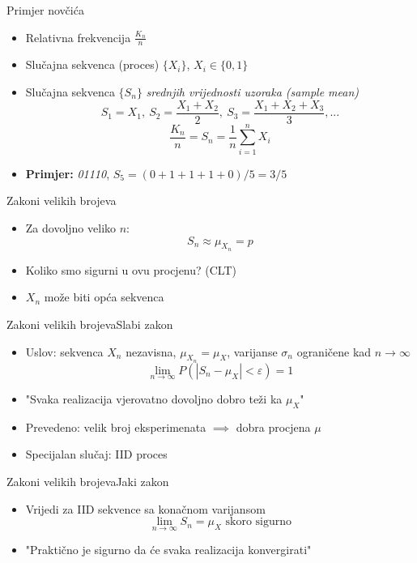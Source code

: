 \documentclass[aspectratio=169]{beamer}
\begin{document}
  \begin{frame}{Primjer novčića}
    \begin{itemize}
      \item Relativna frekvencija $\frac{K_n}{n}$
      \item Slučajna sekvenca (proces) $\{X_i\}$, $X_i \in \{0,1\}$
      \item Slučajna sekvenca $\{S_n\}$ \textit{srednjih vrijednosti uzoraka
        (sample mean)}
        $$S_1=X_1,\ S_2=\frac{X_1+X_2}{2},\ S_3=\frac{X_1+X_2+X_3}{3},...$$
        $$\boxed{\frac{K_n}{n} = S_n = \frac{1}{n} \sum_{i=1}^n X_i}$$
      \item \textbf{Primjer:} \textit{01110}, $S_5=(0+1+1+1+0)/5=3/5$
    \end{itemize}
  \end{frame}
  
  \begin{frame}{Zakoni velikih brojeva}
    \begin{itemize}
      \item Za dovoljno veliko $n$:
        \begin{equation*}
          S_n \approx \mu_{X_n} = p
        \end{equation*}
      \item Koliko smo sigurni u ovu procjenu? (CLT) %
      \item $X_n$ može biti opća sekvenca
    \end{itemize}
  \end{frame}

  \begin{frame}{Zakoni velikih brojeva}{Slabi zakon}
    \begin{itemize}
      \item Uslov: sekvenca $X_n$ nezavisna, $\mu_{X_n}=\mu_X$, varijanse
        $\sigma_n$ ograničene kad $n\to\infty$
      $$\lim_{n\to\infty} P \left(|S_n - \mu_X| < \varepsilon\right) = 1$$
      \item "Svaka realizacija vjerovatno dovoljno dobro teži ka $\mu_X$"
      \item Prevedeno: velik broj eksperimenata $\implies$ dobra procjena $\mu$
      \item Specijalan slučaj: IID proces
    \end{itemize}
  \end{frame}

  \begin{frame}{Zakoni velikih brojeva}{Jaki zakon}
    \begin{itemize}
      \item Vrijedi za IID sekvence sa konačnom varijansom
      $$\lim_{n\to\infty} S_n = \mu_X \text{ skoro sigurno}$$
      \item "Praktično je sigurno da će svaka realizacija konvergirati"
    \end{itemize}
  \end{frame}
  
\end{document}
